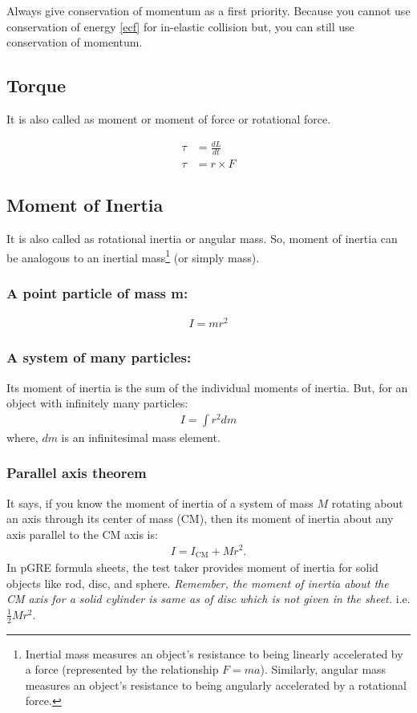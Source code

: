 \documentclass[12pt,a4paper]{article}
\begin{document}
Always give conservation of momentum as a first priority. Because you cannot use conservation of energy \ref{ecf} for in-elastic collision but, you can still use conservation of momentum. 

\subsection{Torque}

It is also called as moment or moment of force or rotational force.

\begin{align}
\tau &= \frac{dL}{dt} \nonumber \\
\tau &= r \times F 
\end{align}

\subsection{Moment of Inertia}
It is also called as rotational inertia or angular mass. So, moment of inertia can be analogous to an inertial mass\footnote{Inertial mass measures an object's resistance to being linearly accelerated by a force (represented by the relationship $F = ma$). Similarly, angular mass measures an object's resistance to being angularly accelerated by a rotational force.} (or simply mass).

\subsubsection*{A point particle of mass m:}
\begin{align*}
I = m r^{2}
\end{align*}
\subsubsection*{A system of many particles:}
Its moment of inertia is the sum of the individual moments of inertia. But, for an object with infinitely many particles:
\begin{align*}
I = \int r^{2} dm
\end{align*}
where, $dm$ is an infinitesimal mass element.

\subsubsection{Parallel axis theorem}
It says, if you know the moment of inertia of a system of mass $M$ rotating about an axis through its center of mass (CM), then its moment of inertia about any axis parallel to the CM axis is:
\begin{align}
I = I_{\text{CM}} + M r^{2}.
\end{align}
In pGRE formula sheets, the test taker provides moment of inertia for solid objects like rod, disc, and sphere. \emph{Remember, the moment of inertia about the \emph{CM} axis for a solid cylinder is same as of disc which is not given in the sheet.} i.e. $\frac{1}{2}M r^{2}$.
\end{document}
